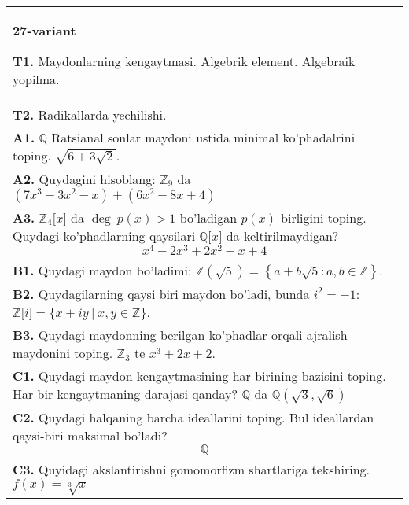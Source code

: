 \documentclass{article}
\begin{document}
\begin{tabular}{m{17cm}}
\textbf{27-variant}
\newline

\textbf{T1.} Maydonlarning kengaytmasi. Algebrik element. Algebraik yopilma. \\
\textbf{T2.} Radikallarda yechilishi. \\
\textbf{A1.} \(\mathbb{Q}\) Ratsianal sonlar maydoni ustida minimal ko'phadalrini toping.
\(\sqrt{6 + 3\sqrt{2}}\). \\
\textbf{A2.} Quydagini hisoblang:
\(\mathbb{Z}_{9}\) da \(\left( 7x^{3} + 3x^{2} - x \right) + \left( 6x^{2} - 8x + 4 \right)\) \\
\textbf{A3.} \(\mathbb{Z}_{4}\lbrack x\rbrack\) da \(\deg\ p(x) > 1\) bo'ladigan \(p(x)\) birligini toping. Quydagi ko'phadlarning qaysilari \(\mathbb{Q\lbrack}x\rbrack\) da keltirilmaydigan?
\[x^{4} - 2x^{3} + 2x^{2} + x + 4\] \\
\textbf{B1.} Quydagi maydon bo'ladimi:
\(\mathbb{Z}\left( \sqrt{5} \right) = \left\{ a + b\sqrt{5}:a,b \in \mathbb{Z} \right\}\). \\
\textbf{B2.} Quydagilarning qaysi biri maydon bo'ladi, bunda \(i^{2} = - 1\):
\(\mathbb{Z\lbrack}i\rbrack = \{ x + iy\ |\ x,y \in \mathbb{Z\}}\). \\
\textbf{B3.} Quydagi maydonning berilgan ko'phadlar orqali ajralish maydonini toping.
\(\mathbb{Z}_{3}\) te \(x^{3} + 2x + 2\). \\
\textbf{C1.} Quydagi maydon kengaytmasining har birining bazisini toping. Har bir kengaytmaning darajasi qanday?
\(\mathbb{Q}\) da \(\mathbb{Q}\left( \sqrt{3},\sqrt{6} \right)\) \\
\textbf{C2.} Quydagi halqaning barcha ideallarini toping. Bul ideallardan qaysi-biri maksimal bo'ladi?
\[\mathbb{Q}\] \\
\textbf{C3.} Quyidagi akslantirishni gomomorfizm shartlariga tekshiring. \(f(x) = \sqrt[3]{x}\) \\

\end{tabular}
\vspace{1cm}
\end{document}
